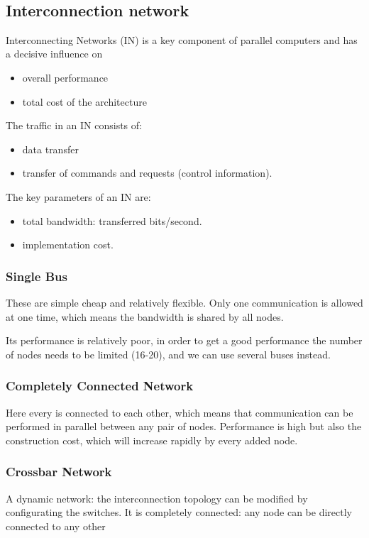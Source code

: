  \\

\subsection{Interconnection network}
Interconnecting Networks (IN) is a key component of parallel computers and has a decisive influence on
\begin{itemize}
\item overall performance
\item total cost of the architecture
\end{itemize}

The traffic in an IN consists of:
\begin{itemize}
\item data transfer
\item transfer of commands and requests (control information).
\end{itemize}

The key parameters of an IN are:
\begin{itemize}
\item total bandwidth: transferred bits/second.
\item implementation cost. 
\end{itemize}

\subsubsection{Single Bus}
These are simple cheap and relatively flexible. Only one communication is allowed at one time, which means the bandwidth is shared by all nodes.

Its performance is relatively poor, in order to get a good performance the number of nodes needs to be limited (16-20), and we can use several buses instead.
\subsubsection{Completely Connected Network}
Here every is connected to each other, which means that communication can be performed in parallel between any pair of nodes. Performance is high but also the construction cost, which will increase rapidly by every added node.
\subsubsection{Crossbar Network}
A dynamic network: the interconnection topology can be modified by configurating the switches. It is completely connected: any node can be directly connected to any other
\\
